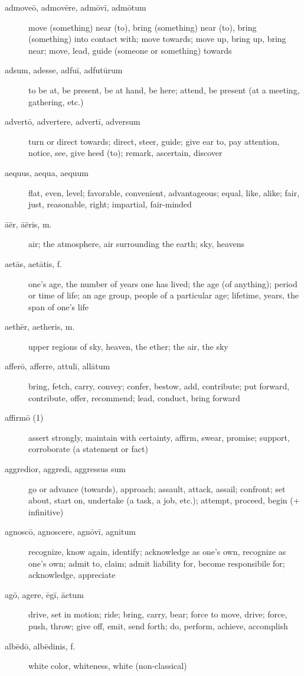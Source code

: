 \begin{description}
    \item[admoveō, admovēre, admōvī, admōtum]  move (something) near (to), bring (something) near (to), bring (something) into contact with; move towards; move up, bring up, bring near; move, lead, guide (someone or something) towards
    \item[adsum, adesse, adfuī, adfutūrum] to be at, be present, be at hand, be here; attend, be present (at a meeting, gathering, etc.)
    \item[advertō, advertere, advertī, adversum] turn or direct towards; direct, steer, guide; give ear to, pay attention, notice, see, give heed (to); remark, ascertain, discover
    \item[aequus, aequa, aequum] flat, even, level; favorable, convenient, advantageous; equal, like, alike; fair, just, reasonable, right; impartial, fair-minded
    \item[āër, āëris, m.] air; the atmosphere, air surrounding the earth; sky, heavens
    \item[aetās, aetātis, f.] one's age, the number of years one has lived; the age (of anything); period or time of life; an age group, people of a particular age; lifetime, years, the span of one's life
    \item[aethēr, aetheris, m.] upper regions of sky, heaven, the ether; the air, the sky
    \item[afferō, afferre, attulī, allātum] bring, fetch, carry, convey; confer, bestow, add, contribute; put forward, contribute, offer, recommend; lead, conduct, bring forward
    \item[affirmō (1)] assert strongly, maintain with certainty, affirm, swear, promise; support, corroborate (a statement or fact)
    \item[aggredior, aggredi, aggressus sum] go or advance (towards), approach; assault, attack, assail; confront; set about, start on, undertake (a task, a job, etc.); attempt, proceed, begin (+ infinitive)
    \item[agnoscō, agnoscere, agnōvī, agnitum] recognize, know again, identify; acknowledge as one's own, recognize as one's own; admit to, claim; admit liability for, become responsibile for; acknowledge, appreciate
    \item[agō, agere, ēgī, āctum] drive, set in motion; ride; bring, carry, bear; force to move, drive; force, push, throw; give off, emit, send forth; do, perform, achieve, accomplish
    \item[albēdō, albēdinis, f.] white color, whiteness, white (non-classical)

\end{description}
